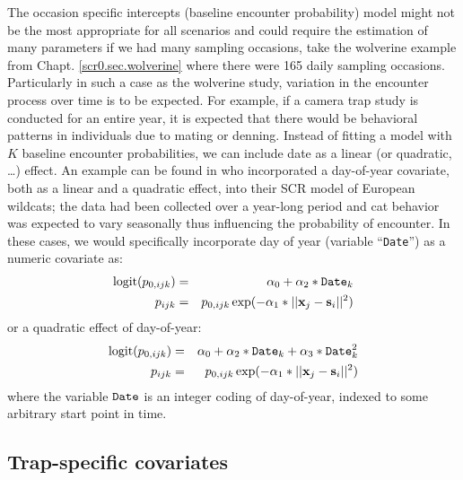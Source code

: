 The occasion specific intercepts (baseline encounter probability)
model might not be the most appropriate for all scenarios and could
require the estimation of many parameters if we had many sampling
occasions, take the wolverine example from
Chapt. \ref{scr0.sec.wolverine} where there were 165 daily sampling
occasions.  Particularly in such a case as the wolverine study,
variation in the encounter process over time is to be expected. For
example, if a camera trap study is conducted for an entire year, it is
expected that there would be behavioral patterns in individuals due to
mating or denning. Instead of fitting a model with $K$ baseline
encounter probabilities, we can include date as a linear (or
quadratic, \ldots) effect. An example can be found in
\citet{kery_etal:2011} who incorporated a day-of-year covariate, both
as a linear and a quadratic effect, into their SCR model of European
wildcats; the data had been collected over a year-long period and cat
behavior was expected to vary seasonally thus influencing the
probability of encounter.  In these cases, we would specifically
incorporate day of year (variable ``\mbox{\tt Date}'') as a numeric
covariate as:
\begin{eqnarray*}
\mbox{logit}(p_{0,ijk}) &=& \alpha_0 + \alpha_2*\mbox{\tt Date}_{k} \\
p_{ijk} &= &p_{0, ijk} \exp(- \alpha_1*||{\bf x}_{j}-{\bf s}_{i}||^2)
\end{eqnarray*}
or a quadratic effect of day-of-year:
\begin{eqnarray*}
\mbox{logit}(p_{0,ijk})& =& \alpha_0 + \alpha_2*\mbox{\tt Date}_{k}
 + \alpha_3*\mbox{\tt Date}_{k}^{2} \\
p_{ijk} &= &p_{0,ijk} \exp(- \alpha_{1}*||{\bf x}_{j}-{\bf s}_{i}||^2)
\end{eqnarray*}
where the variable $\mbox{\tt Date}$ is an integer coding of
day-of-year, indexed to some arbitrary start point in time.



\subsection{Trap-specific covariates}

